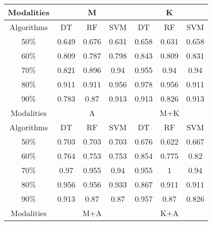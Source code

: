 \begin{table}[h]
\begin{tabular}{|c|c|c|c|ccc}
\hline
Modalities & \multicolumn{3}{c|}{M}     & \multicolumn{3}{c|}{K}                                                               \\ \hline
Algorithms & DT       & RF      & SVM   & \multicolumn{1}{c|}{DT}    & \multicolumn{1}{c|}{RF}    & \multicolumn{1}{c|}{SVM}   \\ \hline
50\%       & 0.649    & 0.676   & 0.631 & \multicolumn{1}{c|}{0.658} & \multicolumn{1}{c|}{0.631} & \multicolumn{1}{c|}{0.658} \\
60\%       & 0.809    & 0.787   & 0.798 & \multicolumn{1}{c|}{0.843} & \multicolumn{1}{c|}{0.809} & \multicolumn{1}{c|}{0.831} \\
70\%       & 0.821    & 0.896   & 0.94  & \multicolumn{1}{c|}{0.955} & \multicolumn{1}{c|}{0.94}  & \multicolumn{1}{c|}{0.94}  \\
80\%       & 0.911    & 0.911   & 0.956 & \multicolumn{1}{c|}{0.978} & \multicolumn{1}{c|}{0.956} & \multicolumn{1}{c|}{0.911} \\
90\%       & 0.783    & 0.87    & 0.913 & \multicolumn{1}{c|}{0.913} & \multicolumn{1}{c|}{0.826} & \multicolumn{1}{c|}{0.913} \\ \hline
Modalities & \multicolumn{3}{c|}{A}     & \multicolumn{3}{c|}{M+K}                                                             \\ \hline
Algorithms & DT       & RF      & SVM   & \multicolumn{1}{c|}{DT}    & \multicolumn{1}{c|}{RF}    & \multicolumn{1}{c|}{SVM}   \\ \hline
50\%       & 0.703    & 0.703   & 0.703 & \multicolumn{1}{c|}{0.676} & \multicolumn{1}{c|}{0.622} & \multicolumn{1}{c|}{0.667} \\
60\%       & 0.764    & 0.753   & 0.753 & \multicolumn{1}{c|}{0.854} & \multicolumn{1}{c|}{0.775} & \multicolumn{1}{c|}{0.82}  \\
70\%       & 0.97     & 0.955   & 0.94  & \multicolumn{1}{c|}{0.955} & \multicolumn{1}{c|}{1}     & \multicolumn{1}{c|}{0.94}  \\
80\%       & 0.956    & 0.956   & 0.933 & \multicolumn{1}{c|}{0.867} & \multicolumn{1}{c|}{0.911} & \multicolumn{1}{c|}{0.911} \\
90\%       & 0.913    & 0.87    & 0.87  & \multicolumn{1}{c|}{0.957} & \multicolumn{1}{c|}{0.87}  & \multicolumn{1}{c|}{0.826} \\ \hline
Modalities & \multicolumn{3}{c|}{M+A}   & \multicolumn{3}{c|}{K+A}                                                             \\ \hline

\end{tabular}
\end{table}

